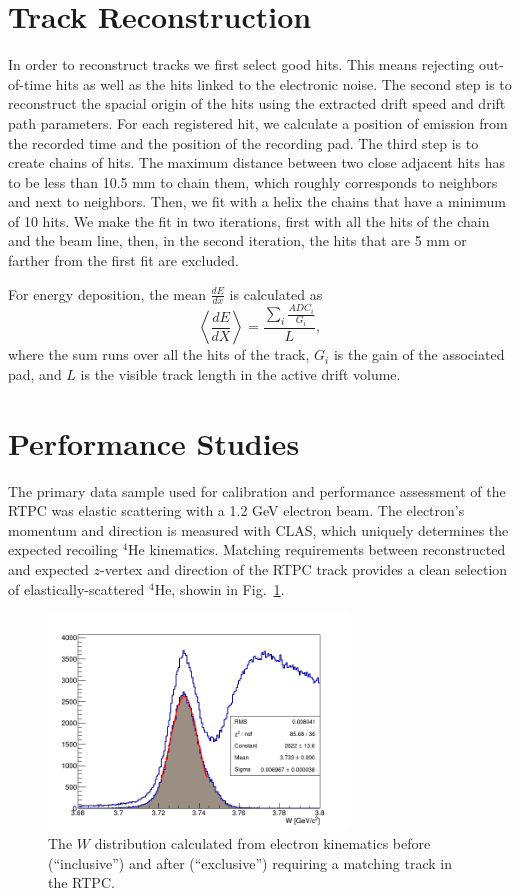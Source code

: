 \documentclass[preprint,5p]{elsarticle}
\begin{document}
\section{Track Reconstruction}\label{sec_rec}
In order to reconstruct tracks we first select good hits. This means rejecting 
out-of-time hits as well as the hits linked to the electronic noise. The second step is 
to reconstruct the spacial origin of the hits using the extracted drift speed and drift path 
parameters. For each registered hit, we calculate a position of emission from 
the recorded time and the position of the recording pad. The third step 
is to create chains of hits. The maximum distance between two close adjacent 
hits has to be less than 10.5 mm to chain them, which roughly corresponds to 
neighbors and next to neighbors. Then, we fit with a helix the chains that have a minimum of 
10 hits. We make the fit in two iterations, first with all the hits of the chain 
and the beam line, then, in the second iteration, 
the hits that are 5 mm or farther from the first fit are excluded.

For energy deposition, the mean $\frac{dE}{dx}$ is calculated as
\begin{equation}
 \left\langle \frac{dE}{dX} \right\rangle= \frac{\sum\limits_{i} \frac{ADC_{i}}{G_i}}{L},
\end{equation}
where the sum runs over all the hits of the track, $G_{i}$ is the gain of 
the associated pad, and $L$ is the visible track length in the active drift 
volume. 

\section{Performance Studies}\label{sec_perfor}

The primary data sample used for calibration and performance assessment of the
RTPC was elastic scattering with a 1.2 GeV electron beam.  The electron's momentum
and direction is measured with CLAS, which uniquely determines the expected recoiling
$^4$He kinematics.  Matching requirements between reconstructed and expected $z$-vertex
and direction of the RTPC track provides a clean selection of elastically-scattered
$^4$He, showin in Fig.~\ref{fig:w}.


\begin{figure}[tb]\centering
  \includegraphics[width=8cm]{fig/fit_W_distribution_l.png}
  \caption{The $W$ distribution calculated from electron kinematics before (``inclusive'')
  and after (``exclusive'') requiring a matching track in the RTPC.\label{fig:w}}
\end{figure}
\end{document}
